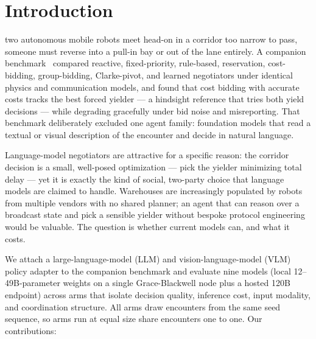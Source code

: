 \documentclass[journal]{IEEEtran}
\begin{document}
\section{Introduction}
 two autonomous mobile robots meet head-on in a corridor too narrow to pass, someone must reverse into a pull-in bay or out of the lane entirely. A companion benchmark~\cite{paper1} compared reactive, fixed-priority, rule-based, reservation, cost-bidding, group-bidding, Clarke-pivot, and learned negotiators under identical physics and communication models, and found that cost bidding with accurate costs tracks the best forced yielder --- a hindsight reference that tries both yield decisions --- while degrading gracefully under bid noise and misreporting. That benchmark deliberately excluded one agent family: foundation models that read a textual or visual description of the encounter and decide in natural language.

Language-model negotiators are attractive for a specific reason: the corridor decision is a small, well-posed optimization --- pick the yielder minimizing total delay --- yet it is exactly the kind of social, two-party choice that language models are claimed to handle. Warehouses are increasingly populated by robots from multiple vendors with no shared planner; an agent that can reason over a broadcast state and pick a sensible yielder without bespoke protocol engineering would be valuable. The question is whether current models can, and what it costs.

We attach a large-language-model (LLM) and vision-language-model (VLM) policy adapter to the companion benchmark and evaluate nine models (local 12--49B-parameter weights on a single Grace-Blackwell node plus a hosted 120B endpoint) across arms that isolate decision quality, inference cost, input modality, and coordination structure. All arms draw encounters from the same seed sequence, so arms run at equal size share encounters one to one. Our contributions:
\end{document}
